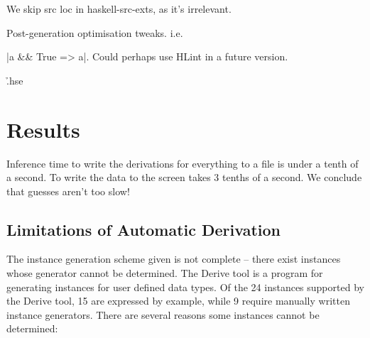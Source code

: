 \documentclass[preprint]{sigplanconf}
\begin{document}
We skip src loc in haskell-src-exts, as it's irrelevant.

Post-generation optimisation tweaks. i.e. \ignore|a && True => a|. Could perhaps use HLint in a future version.

\h{.hse}

\section{Results}

Inference time to write the derivations for everything to a file is under a tenth of a second. To write the data to the screen takes 3 tenths of a second. We conclude that guesses aren't too slow!

\subsection{Limitations of Automatic Derivation}
\label{sec:automatic_failure}

The instance generation scheme given is not complete -- there exist instances whose generator cannot be determined. The Derive tool \cite{derive} is a program for generating instances for user defined data types. Of the 24 instances supported by the Derive tool, 15 are expressed by example, while 9 require manually written instance generators. There are several reasons some instances cannot be determined:
\end{document}
